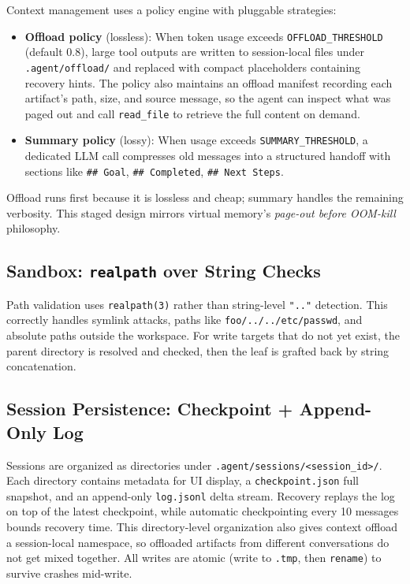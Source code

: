 \documentclass[11pt,a4paper]{article}
\begin{document}
Context management uses a policy engine with pluggable strategies:

\begin{itemize}[leftmargin=2em]
  \item \textbf{Offload policy} (lossless): When token usage exceeds
        \texttt{OFFLOAD\_THRESHOLD} (default 0.8), large tool outputs are
        written to session-local files under \texttt{.agent/offload/} and
        replaced with compact placeholders containing recovery hints. The
        policy also maintains an offload manifest recording each artifact's
        path, size, and source message, so the agent can inspect what was
        paged out and call \texttt{read\_file} to retrieve the full content on
        demand.
  \item \textbf{Summary policy} (lossy): When usage exceeds
        \texttt{SUMMARY\_THRESHOLD}, a dedicated LLM call compresses old
        messages into a structured handoff with sections like
        \texttt{## Goal}, \texttt{## Completed}, \texttt{## Next Steps}.
\end{itemize}

Offload runs first because it is lossless and cheap; summary handles the
remaining verbosity. This staged design mirrors virtual memory's
\emph{page-out before OOM-kill} philosophy.

\subsection{Sandbox: \texttt{realpath} over String Checks}

Path validation uses \texttt{realpath(3)} rather than string-level
\texttt{".."} detection. This correctly handles symlink attacks, paths like
\texttt{foo/../../etc/passwd}, and absolute paths outside the workspace. For
write targets that do not yet exist, the parent directory is resolved and
checked, then the leaf is grafted back by string concatenation.

\subsection{Session Persistence: Checkpoint + Append-Only Log}

Sessions are organized as directories under
\texttt{.agent/sessions/<session\_id>/}. Each directory contains metadata for
UI display, a \texttt{checkpoint.json} full snapshot, and an append-only
\texttt{log.jsonl} delta stream. Recovery replays the log on top of the latest
checkpoint, while automatic checkpointing every 10 messages bounds recovery
time. This directory-level organization also gives context offload a
session-local namespace, so offloaded artifacts from different conversations do
not get mixed together. All writes are atomic (write to \texttt{.tmp}, then
\texttt{rename}) to survive crashes mid-write.
\end{document}
